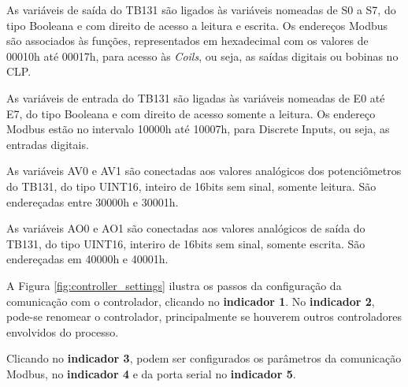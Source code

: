 As variáveis de saída do TB131 
são ligados às variáveis nomeadas de S0 a S7, 
do tipo Booleana e com direito de acesso a leitura e escrita. 
Os endereços Modbus são associados às funções, 
representados em hexadecimal com os valores de 00010h até 00017h,
para acesso às \textit{Coils}, ou seja, as saídas digitais ou bobinas no CLP. 

As variáveis de entrada do TB131 
são ligadas às variáveis nomeadas de E0 até E7, 
do tipo Booleana e com direito de acesso somente a leitura. 
Os endereço Modbus estão no intervalo 10000h até 10007h, 
para Discrete Inputs, ou seja, as entradas digitais.

As variáveis AV0 e AV1 
são conectadas aos valores analógicos dos potenciômetros do TB131,
do tipo UINT16, inteiro de 16bits sem sinal, somente leitura. 
São endereçadas entre 30000h e 30001h. 

As variáveis AO0 e AO1 
são conectadas aos valores analógicos de saída do TB131, 
do tipo UINT16, interiro de 16bits sem sinal, somente escrita. 
São endereçadas em 40000h e 40001h. 



\begin{figure}[ht!]
	\centering
\end{figure}




A Figura \ref{fig:controller_settings} ilustra 
os passos da configuração da comunicação com o controlador, 
clicando no \textbf{indicador 1}.
No \textbf{indicador 2}, 
pode-se renomear o controlador, 
principalmente se houverem outros controladores envolvidos do processo. 



Clicando no \textbf{indicador 3}, 
podem ser configurados os parâmetros da comunicação Modbus, 
no \textbf{indicador 4} e da porta serial no \textbf{indicador 5}.


